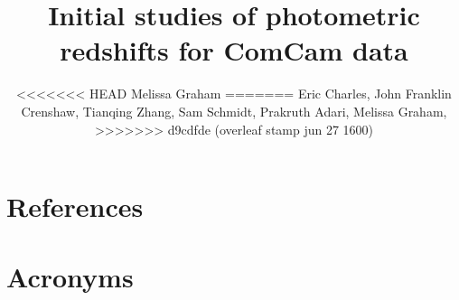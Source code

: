 \documentclass[SE,lsstdraft,authoryear,toc]{lsstdoc}
\title{Initial studies of photometric redshifts for ComCam data}
\author{%
<<<<<<< HEAD
Melissa Graham
=======
  Eric Charles,
  John Franklin Crenshaw,
  Tianqing Zhang, 
  Sam Schmidt,
  Prakruth Adari, 
  Melissa Graham,  
>>>>>>> d9cdfde (overleaf stamp jun 27 1600)
}
\date{\vcsDate}
\begin{document}
\maketitle


\appendix

\section{References} \label{sec:bib}
\renewcommand{\refname}{} %


\section{Acronyms} \label{sec:acronyms}

\end{document}
